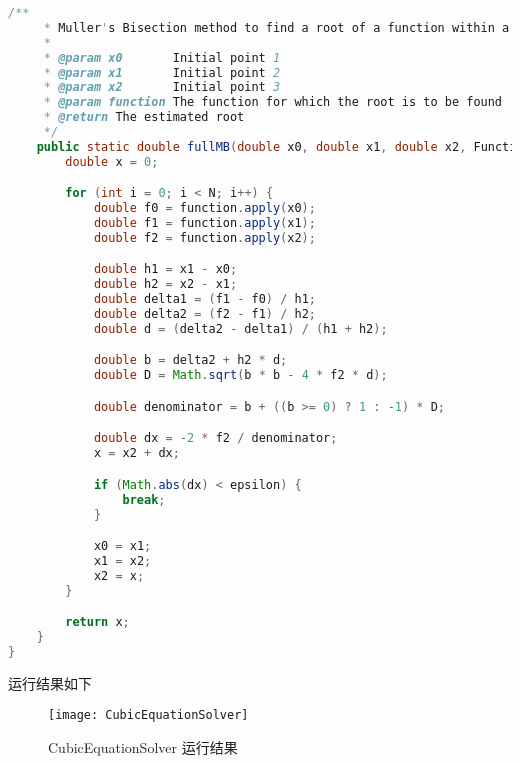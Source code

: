 \documentclass[UTF8]{ctexart}
\begin{document}
\begin{lstlisting}[language=Java, breaklines = true,label={lst:lstlisting3}]
    /**
     * Muller's Bisection method to find a root of a function within a given interval.
     *
     * @param x0       Initial point 1
     * @param x1       Initial point 2
     * @param x2       Initial point 3
     * @param function The function for which the root is to be found
     * @return The estimated root
     */
    public static double fullMB(double x0, double x1, double x2, Function<Double, Double> function) {
        double x = 0;

        for (int i = 0; i < N; i++) {
            double f0 = function.apply(x0);
            double f1 = function.apply(x1);
            double f2 = function.apply(x2);

            double h1 = x1 - x0;
            double h2 = x2 - x1;
            double delta1 = (f1 - f0) / h1;
            double delta2 = (f2 - f1) / h2;
            double d = (delta2 - delta1) / (h1 + h2);

            double b = delta2 + h2 * d;
            double D = Math.sqrt(b * b - 4 * f2 * d);

            double denominator = b + ((b >= 0) ? 1 : -1) * D;

            double dx = -2 * f2 / denominator;
            x = x2 + dx;

            if (Math.abs(dx) < epsilon) {
                break;
            }

            x0 = x1;
            x1 = x2;
            x2 = x;
        }

        return x;
    }
}
    \end{lstlisting}
    运行结果如下
    \begin{figure}[h]
        \centering
        \texttt{[image: CubicEquationSolver]}
        \caption{CubicEquationSolver 运行结果}\label{fig:figure3.5}
    \end{figure}

    \nextpage
\end{document}
